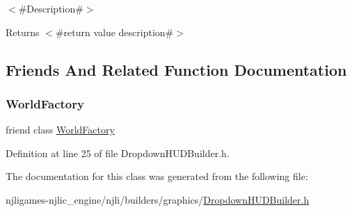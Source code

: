 $<$\#\+Description\#$>$

\begin{DoxyReturn}{Returns}
$<$\#return value description\#$>$ 
\end{DoxyReturn}


\subsection{Friends And Related Function Documentation}
\mbox{\label{classnjli_1_1_dropdown_h_u_d_builder_acb96ebb09abe8f2a37a915a842babfac}} 
\subsubsection{\texorpdfstring{World\+Factory}{WorldFactory}}
{\footnotesize\ttfamily friend class \mbox{\hyperlink{classnjli_1_1_world_factory}{World\+Factory}}\hspace{0.3cm}{\ttfamily [friend]}}



Definition at line 25 of file Dropdown\+H\+U\+D\+Builder.\+h.



The documentation for this class was generated from the following file\+:\begin{DoxyCompactItemize}
\item 
njligames-\/njlic\+\_\+engine/njli/builders/graphics/\mbox{\hyperlink{_dropdown_h_u_d_builder_8h}{Dropdown\+H\+U\+D\+Builder.\+h}}\end{DoxyCompactItemize}
